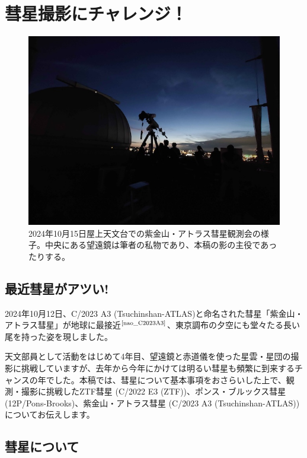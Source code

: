 \documentclass[../../super_nova_2024]{subfiles}
\begin{document}
\chapter{彗星撮影にチャレンジ！} %

\begin{figure}
  \centering
  \includegraphics[width=\textwidth]{img/DSC_2704.jpg}
  \caption{2024年10月15日屋上天文台での紫金山・アトラス彗星観測会の様子。中央にある望遠鏡は筆者の私物であり、本稿の影の主役であったりする。}
\end{figure}
\section{最近彗星がアツい!}

2024年10月12日、C/2023 A3 (Tsuchinshan-ATLAS)と命名された彗星「紫金山・アトラス彗星」が地球に最接近$^\text{\cite{nao_C2023A3}}$、東京調布の夕空にも堂々たる長い尾を持った姿を現しました。

天文部員として活動をはじめて4年目、望遠鏡と赤道儀を使った星雲・星団の撮影に挑戦していますが、去年から今年にかけては明るい彗星も頻繁に到来するチャンスの年でした。本稿では、彗星について基本事項をおさらいした上で、観測・撮影に挑戦したZTF彗星 (C/2022 E3 (ZTF))、ポンス・ブルックス彗星 (12P/Pons-Brooks)、紫金山・アトラス彗星 (C/2023 A3 (Tsuchinshan-ATLAS))についてお伝えします。

\section{彗星について}
\end{document}
